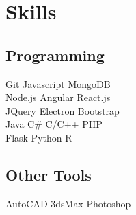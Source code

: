 \documentclass[a4paper]{resume}
\begin{document}
\begin{minipage}[t]{0.33\textwidth}
\sectionspace %



\section{Skills}

\subsection{Programming}

Git \textbullet{} Javascript \textbullet{} MongoDB \\
Node.js \textbullet{} Angular \textbullet{} React.js \\
JQuery \textbullet{} Electron \textbullet{} Bootstrap \\
Java \textbullet{} C\# \textbullet{} C/C++ \textbullet{} PHP \\
Flask \textbullet{} Python \textbullet{} R \\

\sectionspace %

\subsection{Other Tools}
AutoCAD \textbullet{} 3dsMax \textbullet{} Photoshop


\end{minipage} %
\hfill
%
%
\end{document}
